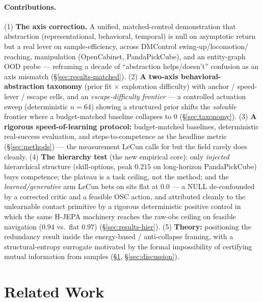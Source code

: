 \documentclass{article}
\begin{document}
\paragraph{Contributions.}
(1) \textbf{The axis correction.} A unified, matched-control demonstration that
abstraction (representational, behavioral, temporal) is null on asymptotic return
but a real lever on sample-efficiency, across DMControl swing-up/locomotion/
reaching, manipulation (OpenCabinet, PandaPickCube), and an entity-graph OOD
probe --- reframing a decade of ``abstraction helps/doesn't'' confusion as an
axis mismatch (\S\ref{sec:results-matched}).
(2) \textbf{A two-axis behavioral-abstraction taxonomy} (prior fit $\times$
exploration difficulty) with anchor / speed-lever / escape cells, and an
\emph{escape-difficulty frontier} --- a controlled actuation sweep (deterministic
$n=64$) showing a structured prior shifts the \emph{solvable} frontier where a
budget-matched baseline collapses to $0$ (\S\ref{sec:taxonomy}).
(3) \textbf{A rigorous speed-of-learning protocol:} budget-matched baselines,
deterministic real-success evaluation, and steps-to-competence as the headline
metric (\S\ref{sec:methods}) --- the measurement LeCun calls for but the field
rarely does cleanly.
(4) \textbf{The hierarchy test} (the new empirical core): only \emph{injected}
hierarchical structure (skill-options, peak $0.215$ on long-horizon
PandaPickCube) buys competence; the plateau is a task ceiling, not the method;
and the \emph{learned/generative} arm LeCun bets on sits flat at $0.0$ --- a NULL
de-confounded by a corrected critic and a feasible OSC action, and attributed
cleanly to the unlearnable contact primitive by a rigorous deterministic positive
control in which the same H-JEPA machinery reaches the raw-obs ceiling on feasible
navigation ($0.94$ vs.\ flat $0.97$) (\S\ref{sec:results-hier}).
(5) \textbf{Theory:} positioning the redundancy result inside the energy-based /
anti-collapse framing, with a structural-entropy surrogate motivated by the
formal impossibility of certifying mutual information from samples
(\S\ref{sec:related}, \S\ref{sec:discussion}).

\section{Related Work}
\label{sec:related}
\end{document}
